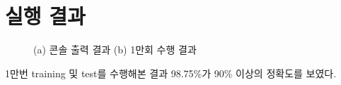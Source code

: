 \documentclass[12pt]{article}
\begin{document}
\section{실행 결과}
\begin{figure}[!h]
	\centering
    \caption{(a) 콘솔 출력 결과 (b) 1만회 수행 결과}
\end{figure}
1만번 training 및 test를 수행해본 결과 98.75\%가 90\% 이상의 정확도를 보였다.

\nocite{wikipedia}



	
\end{document}
